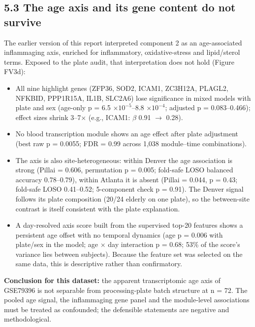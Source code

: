 \documentclass[
]{article}
\providecommand{\tightlist}{%
  \setlength{\itemsep}{0pt}\setlength{\parskip}{0pt}}
\begin{document}
\subsection{5.3 The age axis and its gene content do not
survive}\label{the-age-axis-and-its-gene-content-do-not-survive}

The earlier version of this report interpreted component 2 as an
age-associated inflammaging axis, enriched for inflammatory,
oxidative-stress and lipid/sterol terms. Exposed to the plate audit,
that interpretation does not hold (Figure FV3d):

\begin{itemize}
\tightlist
\item
  All nine highlight genes (ZFP36, SOD2, ICAM1, ZC3H12A, PLAGL2, NFKBID,
  PPP1R15A, IL1B, SLC2A6) lose significance in mixed models with plate
  and sex (age-only p = 6.5 \(\times 10^{-5}\)--8.8 \(\times 10^{-4}\);
  adjusted p = 0.083--0.466); effect sizes shrink 3--7\(\times\) (e.g.,
  ICAM1: \(\beta\) 0.91 \(\to\) 0.28).
\item
  No blood transcription module shows an age effect after plate
  adjustment (best raw p = 0.0055; FDR = 0.99 across 1,038 module--time
  combinations).
\item
  The axis is also site-heterogeneous: within Denver the age association
  is strong (Pillai = 0.606, permutation p = 0.005; fold-safe LOSO
  balanced accuracy 0.78--0.79), within Atlanta it is absent (Pillai =
  0.044, p = 0.43; fold-safe LOSO 0.41--0.52; 5-component check p =
  0.91). The Denver signal follows its plate composition (20/24 elderly
  on one plate), so the between-site contrast is itself consistent with
  the plate explanation.
\item
  A day-resolved axis score built from the supervised top-20 features
  shows a persistent age offset with no temporal dynamics (age p = 0.006
  with plate/sex in the model; age \(\times\) day interaction p = 0.68;
  53\% of the score's variance lies between subjects). Because the
  feature set was selected on the same data, this is descriptive rather
  than confirmatory.
\end{itemize}

\textbf{Conclusion for this dataset:} the apparent transcriptomic age
axis of GSE79396 is not separable from processing-plate batch structure
at n = 72. The pooled age signal, the inflammaging gene panel and the
module-level associations must be treated as confounded; the defensible
statements are negative and methodological.
\end{document}
